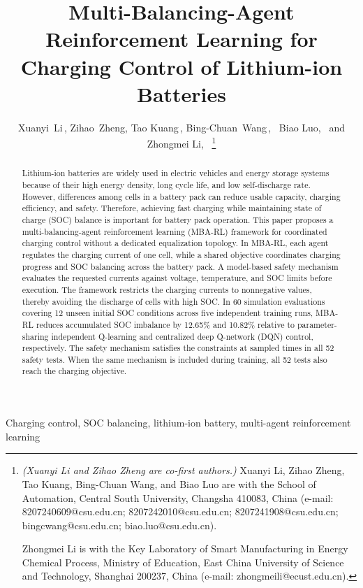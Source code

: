 \documentclass[journal]{IEEEtran}
\begin{document}
\title{Multi-Balancing-Agent Reinforcement Learning for Charging Control of Lithium-ion Batteries}


\author{%
        Xuanyi~Li\,,
        Zihao~Zheng,
        Tao Kuang\,,
        Bing-Chuan~Wang\,,~
        Biao Luo,~
        and Zhongmei Li,~%
\thanks{{\emph{(Xuanyi Li and Zihao Zheng are co-first authors.)}}
        Xuanyi Li, Zihao Zheng, Tao Kuang, Bing-Chuan Wang, and Biao Luo are with the School of Automation, Central South University, Changsha 410083, China (e-mail: 8207240609@csu.edu.cn; 8207242010@csu.edu.cn; 8207241908@csu.edu.cn; bingcwang@csu.edu.cn; biao.luo@csu.edu.cn).

Zhongmei Li is with the Key Laboratory of Smart Manufacturing in Energy Chemical Process, Ministry of Education, East China University of Science and Technology, Shanghai 200237, China (e-mail: zhongmeili@ecust.edu.cn).
}
}

\maketitle
\begin{abstract}
Lithium-ion batteries are widely used in electric vehicles and energy storage systems because of their high energy density, long cycle life, and low self-discharge rate. However, differences among cells in a battery pack can reduce usable capacity, charging efficiency, and safety. Therefore, achieving fast charging while maintaining state of charge (SOC) balance is important for battery pack operation.
This paper proposes a multi-balancing-agent reinforcement learning (MBA-RL) framework for coordinated charging control without a dedicated equalization topology. In MBA-RL, each agent regulates the charging current of one cell, while a shared objective coordinates charging progress and SOC balancing across the battery pack. A model-based safety mechanism evaluates the requested currents against voltage, temperature, and SOC limits before execution. The framework restricts the charging currents to nonnegative values, thereby avoiding the discharge of cells with high SOC.
In 60 simulation evaluations covering 12 unseen initial SOC conditions across five independent training runs, MBA-RL reduces accumulated SOC imbalance by 12.65\% and 10.82\% relative to parameter-sharing independent Q-learning and centralized deep Q-network (DQN) control, respectively. The safety mechanism satisfies the constraints at sampled times in all 52 safety tests. When the same mechanism is included during training, all 52 tests also reach the charging objective.
\end{abstract}
\vspace{-0.55\baselineskip}
\begin{IEEEkeywords}
Charging control, SOC balancing, lithium-ion battery, multi-agent reinforcement learning
\end{IEEEkeywords}

\IEEEpeerreviewmaketitle










\end{document}

